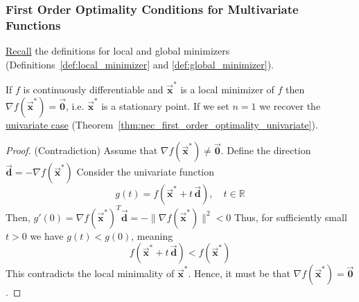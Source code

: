 \documentclass[9pt, headings=standardclasses, parskip=half]{scrartcl}
\renewcommand{\emph}[1]{\textcolor{mypurple}{#1}}
\newcommand{\vect}[1]{\vec{\boldsymbol{#1}}}
\begin{document}
\subsubsection{First Order Optimality Conditions for Multivariate Functions}
\hyperref[subsec:global_local_optimization]{Recall} the definitions for local and global minimizers (Definitions~\ref{def:local_minimizer} and \ref{def:global_minimizer}).

\begin{theorem}\label{thm:nec_first_order_optimality_multivariate}
If \(f\) is continuously differentiable and \(\vect{x}^{*}\) is a local minimizer of \(f\) then 
\(\nabla f(\vect{x}^{*})=\vect{0}\), i.e. \(\vect{x}^{*}\) is a \emph{stationary point}. If we set \(n=1\) we recover the \hyperref[thm:nec_first_order_optimality_univariate]{univariate case} (Theorem~\ref{thm:nec_first_order_optimality_univariate}).
\end{theorem}
\begin{proof}
(Contradiction)
Assume that \(\nabla f(\vect{x}^{*})\neq \vect{0}\). Define the direction
\(
\vect{d}=-\nabla f(\vect{x}^{*})
\)
Consider the univariate function
\[
g(t)=f(\vect{x}^{*}+t\,\vect{d}),\quad t\in\mathbb{R}
\]
Then,
\(
g'(0)=\nabla f(\vect{x}^{*})^{T}\vect{d}=-\|\nabla f(\vect{x}^{*})\|^{2}<0
\)
Thus, for sufficiently small \(t>0\) we have \(g(t)<g(0)\), meaning
\[
f(\vect{x}^{*}+t\,\vect{d})<f(\vect{x}^{*})
\]
This contradicts the local minimality of \(\vect{x}^{*}\). Hence, it must be that \(\nabla f(\vect{x}^{*})=\vect{0}\).
\end{proof}

\end{document}
